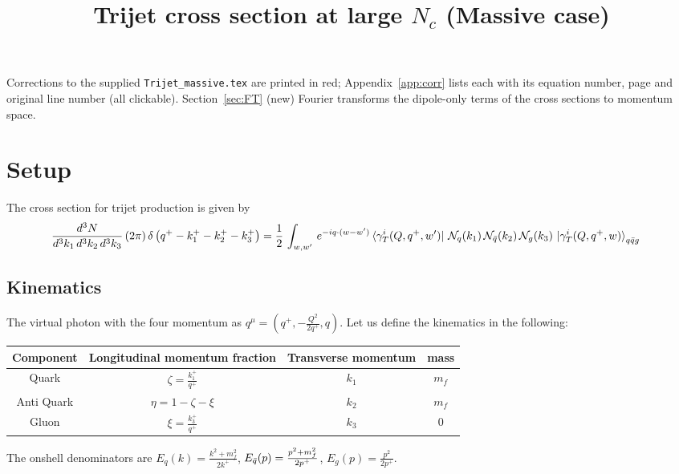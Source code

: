 \documentclass[9pt]{article}
\title{Trijet cross section at large $N_{c}$ (Massive case)}
\author{}
\date{}
\newif\ifmarked \markedtrue
\numberwithin{equation}{section}
\begin{document}
\maketitle
\noindent\ifmarked{\color{red}\textbf{Marked version.}} Corrections to the supplied \texttt{Trijet\_massive.tex} are printed in {\color{red}red}; Appendix~\ref{app:corr} lists each with its equation number, page and original line number (all clickable). \fi Section~\ref{sec:FT} (new) Fourier transforms the dipole-only terms of the cross sections to momentum space.
\section{Setup}
The cross section for trijet production is given by
\begin{align}
    \frac{d^{3}N}{d^{3}k_{1}\,d^{3}k_{2}\, d^{3}k_{3}}\, (2\pi)\,\delta\left(q^{+}-k^{+}_{1}-k^{+}_{2}-k^{+}_{3}\right) & =  \frac{1}{2}\,\int_{w,w'}\, e^{-iq\cdot (w-w')} 
\bra{\gamma^{i}_{T}(Q,q^{+},w')}\,\mathcal{N}_{q}(k_{1})\,\mathcal{N}_{\Bar{q}}(k_{2})\,\mathcal{N}_{g}(k_{3})\,\ket{\gamma^{i}_{T}(Q,q^{+},w)}_{q\Bar{q}g}
\end{align}
\subsection{Kinematics}
The virtual photon with the four momentum as $q^{\mu} = \left(q^{+},-\frac{Q^{2}}{2q^{+}},q\right)$. Let us define the kinematics in the following:
\begin{table}[h!]
\centering
\begin{tabular}{||c c c c||} 
 \hline
 Component & Longitudinal momentum fraction & Transverse momentum & mass \\ [0.5ex] 
 \hline\hline
 Quark & $\zeta = \frac{k^{+}_{1}}{q^{+}}$  & $k_{1}$ & $m_{f}$ \\ 
 Anti Quark & $\eta = 1-\zeta-\xi$  &  $k_{2}$ & $m_{f}$ \\
 Gluon & $\xi = \frac{k^{+}_{3}}{q^{+}}$ & $k_{3}$ & $0$ \\
 \hline
\end{tabular}
\label{table:1}
\end{table}
The onshell denominators are $E_{q}(k) = \frac{k^{2}+m_{f}^{2}}{2k^{+}}$, $E_{\Bar{q}}(p) = \frac{p^{2}+m_{f}^{2}}{2p^{+}}$, $E_{g}(p) = \frac{p^{2}}{2p^{+}}$.  
\end{document}

